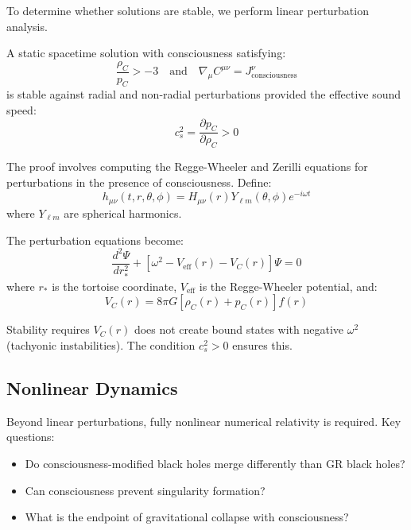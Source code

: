 To determine whether solutions are stable, we perform linear perturbation analysis.

\begin{theorem}\label{thm:stability-consciousness}
A static spacetime solution with consciousness satisfying:
\begin{equation}
\frac{\rho_C}{p_C} > -3 \quad \text{and} \quad \nabla_\mu C^{\mu\nu} = J^\nu_{\text{consciousness}}
\end{equation}
is stable against radial and non-radial perturbations provided the effective sound speed:
\begin{equation}
c_s^2 = \frac{\partial p_C}{\partial \rho_C} > 0
\end{equation}
\end{theorem}

\begin{level3}
The proof involves computing the Regge-Wheeler and Zerilli equations for perturbations in the presence of consciousness. Define:
\begin{equation}
h_{\mu\nu}(t, r, \theta, \phi) = H_{\mu\nu}(r) Y_{\ell m}(\theta, \phi) e^{-i\omega t}
\end{equation}
where $Y_{\ell m}$ are spherical harmonics.

The perturbation equations become:
\begin{equation}
\frac{d^2\Psi}{dr_*^2} + \left[ \omega^2 - V_{\text{eff}}(r) - V_C(r) \right] \Psi = 0
\end{equation}
where $r_*$ is the tortoise coordinate, $V_{\text{eff}}$ is the Regge-Wheeler potential, and:
\begin{equation}
V_C(r) = 8\pi G \left[ \rho_C(r) + p_C(r) \right] f(r)
\end{equation}

Stability requires $V_C(r)$ does not create bound states with negative $\omega^2$ (tachyonic instabilities). The condition $c_s^2 > 0$ ensures this.
\end{level3}

\subsection{Nonlinear Dynamics}

Beyond linear perturbations, fully nonlinear numerical relativity is required. Key questions:

\begin{itemize}
\item Do consciousness-modified black holes merge differently than GR black holes?
\item Can consciousness prevent singularity formation?
\item What is the endpoint of gravitational collapse with consciousness?
\end{itemize}

